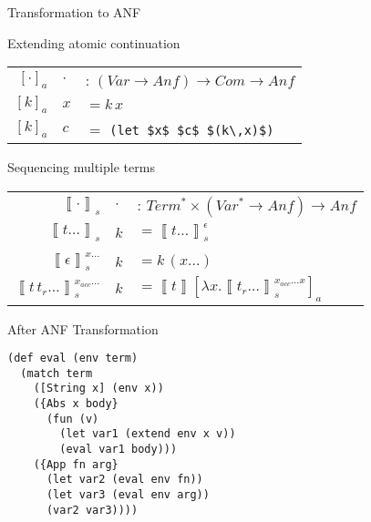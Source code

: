 \documentclass[handout]{beamer}
\newcommand{\bb}[1]{\left\llbracket #1 \right\rrbracket}
\newcommand{\anf}[2]{\bb{#1}#2}
\newcommand{\atomic}[1]{[ #1 ]_{a}}
\begin{document}
\begin{frame}[fragile]{Transformation to ANF}
  \begin{beamerboxesrounded}{Extending atomic continuation}
    \begin{center}
      \begingroup
      \setlength{\tabcolsep}{2pt}
      \begin{tabular}{rll}
        $[\cdot]_a$ & $\cdot$ & : $(Var \rightarrow Anf) \rightarrow Com \rightarrow Anf$\\
        $[k]_a$ & $x$ & $= k\,x$\\
        $[k]_a$ & $c$ & $= $ \lstinline!(let $x$ $c$ $(k\,x)$)!
      \end{tabular}
      \endgroup
      \end{center}
  \end{beamerboxesrounded}
  \vspace{\baselineskip}\pause
  \begin{beamerboxesrounded}{Sequencing multiple terms}
    \begin{center}
      \begingroup
      \setlength{\tabcolsep}{2pt}
      \begin{tabular}{rll}
        $\bb{\cdot}_s$ & $\cdot$ &: $Term^* \times (Var^* \rightarrow Anf) \rightarrow Anf$\\
        $\bb{t\ldots}_s$ & $k$ & $= \bb{t\ldots}_s^{\epsilon}$\\
        \\
        $\bb{\epsilon}_s^{x\ldots}$ & $k$ & $= k\,(x\ldots)$\\
        $\bb{t\,t_r\ldots}_s^{x_{acc}\ldots}$ & $k$ & 
        $= \anf{t}{\atomic{\lambda x . \bb{t_r\ldots}_s^{x_{acc}\ldots x}}}$
      \end{tabular}
      \endgroup
      \end{center}
  \end{beamerboxesrounded}
\end{frame}

\begin{frame}[fragile]{After ANF Transformation}
  \begin{lstlisting}
(def eval (env term)
  (match term
    ([String x] (env x))
    ({Abs x body}
      (fun (v)
        (let var1 (extend env x v))
        (eval var1 body)))
    ({App fn arg}
      (let var2 (eval env fn))
      (let var3 (eval env arg))
      (var2 var3))))
  \end{lstlisting}
\end{frame}
\end{document}
